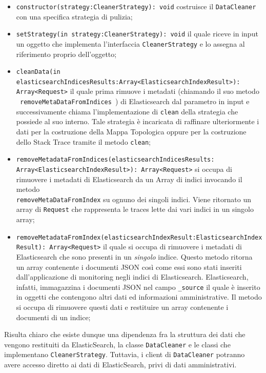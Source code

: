 \begin{itemize} 
	\item  \texttt{constructor(strategy:CleanerStrategy): void} costruisce il \texttt{DataCleaner} con una specifica strategia di pulizia;
	\item \texttt{setStrategy(in strategy:CleanerStrategy): void} il quale riceve in input un oggetto che implementa l'interfaccia \texttt{CleanerStrategy} e lo assegna al riferimento proprio dell'oggetto;

	\item \texttt{cleanData(in elasticsearchIndicesResults:Array<ElasticsearchIndexResult>): Array<Request>} il quale prima rimuove i metadati (chiamando il suo metodo \\ \texttt{ removeMetaDataFromIndices }) di Elasticsearch dal parametro in input e successivamente chiama l'implementazione di \texttt{clean} della strategia che possiede al suo interno.  Tale strategia è incaricata di raffinare ulteriormente i dati per la costruzione della Mappa Topologica oppure per la costruzione dello Stack Trace tramite il metodo \texttt{clean};

	\item \texttt{removeMetadataFromIndices(elasticsearchIndicesResults: \\Array<ElasticsearchIndexResult>): Array<Request>}  si occupa di rimuovere i metadati di Elasticsearch da un Array di indici invocando il metodo\\ \texttt{removeMetaDataFromIndex} su ognuno dei singoli indici. Viene ritornato un array di \texttt{Request} che rappresenta le traces lette dai vari indici in un singolo array;

	\item \texttt{removeMetadataFromIndex(elasticsearchIndexResult:ElasticsearchIndexResult): Array<Request>} il quale si occupa di rimuovere i metadati di Elasticsearch che sono presenti in un \emph{singolo} indice. Questo metodo ritorna un array contenente i documenti JSON così come essi sono stati inseriti dall'applicazione di monitoring negli indici di Elasticsearch. Elasticsearch, infatti, immagazzina i documenti JSON nel campo \texttt{\_source} il quale è inserito in oggetti che contengono altri dati ed informazioni amministrative. Il metodo si occupa di rimuovere questi dati e restituire un array contenente i documenti di un indice;
\end{itemize}

Risulta chiaro che esiste dunque una dipendenza fra la struttura dei dati che vengono restituiti da ElasticSearch, la classe \texttt{DataCleaner} e le classi che implementano \texttt{CleanerStrategy}. Tuttavia, i client di \texttt{DataCleaner} potranno avere accesso diretto ai dati di ElasticSearch, privi di dati amministrativi.
	
